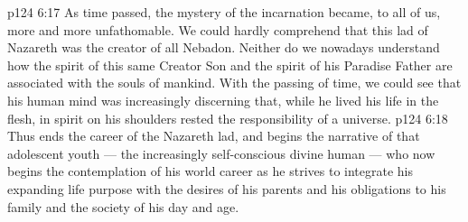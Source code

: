 \vs p124 6:17 As time passed, the mystery of the incarnation became, to all of us, more and more unfathomable. We could hardly comprehend that this lad of Nazareth was the creator of all Nebadon. Neither do we nowadays understand how the spirit of this same Creator Son and the spirit of his Paradise Father are associated with the souls of mankind. With the passing of time, we could see that his human mind was increasingly discerning that, while he lived his life in the flesh, in spirit on his shoulders rested the responsibility of a universe.
\vs p124 6:18 \pc Thus ends the career of the Nazareth lad, and begins the narrative of that adolescent youth --- the increasingly self\hyp{}conscious divine human --- who now begins the contemplation of his world career as he strives to integrate his expanding life purpose with the desires of his parents and his obligations to his family and the society of his day and age.
